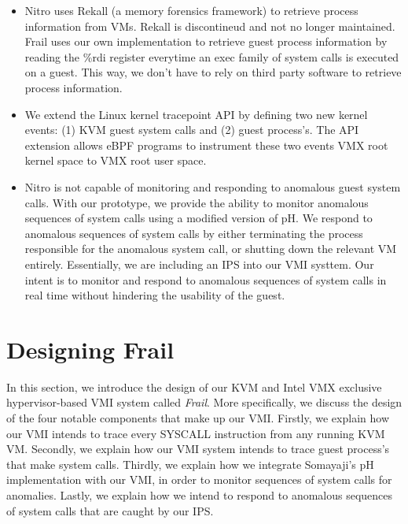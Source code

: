 \documentclass{report}
\begin{document}
\begin{spacing}{1.5}
{\begin{itemize}
  \item Nitro uses Rekall (a memory forensics framework) to retrieve process information from VMs. Rekall is discontineud and not no longer maintained. Frail uses our own implementation to retrieve guest process information by reading the \%rdi register everytime an exec family of system calls is executed on a guest. This way, we don't have to rely on third party software to retrieve process information.
  
  \item We extend the Linux kernel tracepoint API by defining two new kernel events: (1) KVM guest system calls and (2) guest process's. The API extension allows eBPF programs to instrument these two events VMX root kernel space to VMX root user space.
  
  \item Nitro is not capable of monitoring and responding to anomalous guest system calls. With our prototype, we provide the ability to monitor anomalous sequences of system calls using a modified version of pH. We respond to anomalous sequences of system calls by either terminating the process responsible for the anomalous system call, or shutting down the relevant VM entirely. Essentially, we are including an IPS into our VMI systtem. Our intent is to monitor and respond to anomalous sequences of system calls in real time without hindering the usability of the guest.
\newline
\end{itemize}
}

























\chapter{Designing Frail}

{\large
In this section, we introduce the design of our KVM and Intel VMX exclusive hypervisor-based VMI system called \textit{Frail}. More specifically, we discuss the design of the four notable components that make up our VMI. Firstly, we explain how our VMI intends to trace every SYSCALL instruction from any running KVM VM. Secondly, we explain how our VMI system intends to trace guest process's that make system calls. Thirdly, we explain how we integrate Somayaji's pH implementation with our VMI, in order to monitor sequences of system calls for anomalies. Lastly, we explain how we intend to respond to anomalous sequences of system calls that are caught by our IPS. 
\newline
}


\end{spacing}
\end{document}
